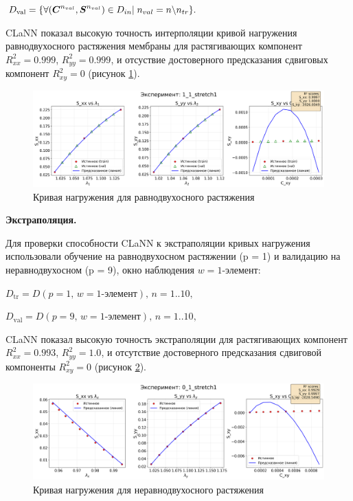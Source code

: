   $D_{\mathrm{val}}=\{\forall (\boldsymbol{C}^{n_{val}}, \boldsymbol{S}^{n_{val}}) \in D_{in}|\; n_{val}=n \backslash  n_{tr}\}.$

  CLaNN показал высокую точность интерполяции кривой нагружения равнодвухосного растяжения мембраны 
  для растягивающих компонент $R^2_{xx}=0.999$, $R^2_{yy}=0.999$, и отсуствие достоверного предсказания сдвиговых 
  компонент $R^2_{xy}=0$ (рисунок \ref{fig:interpolation}).
  
  \begin{figure}[H]
    \centering
    \includegraphics[width=1.0\textwidth]{img/interpolation.png}
    \caption{Кривая нагружения для равнодвухосного растяжения}
    \label{fig:interpolation}
  \end{figure}
  
  \textbf{Экстраполяция.}
  
  Для проверки способности CLaNN к экстраполяции кривых нагружения использовали обучение на равнодвухосном растяжении (p = 1) и валидацию на неравнодвухосном (p = 9), 
  окно наблюдения $w=\text{1-элемент}$:
  
  $D_{\mathrm{tr}} = D(p{=}1,\,w{=}\text{1-элемент}),\, n = 1..10,$
  
  $D_{\mathrm{val}} = D(p{=}9,\,w{=}\text{1-элемент}),\, n = 1..10,$
  
  CLaNN показал высокую точность экстраполяции для растягивающих компонент $R^2_{xx}=0.993$, $R^2_{yy}=1.0$, и отсутствие достоверного предсказания сдвиговой компоненты $R^2_{xy}=0$ (рисунок \ref{fig:extrapolation}).


  \begin{figure}[H]
    \centering
    \includegraphics[width=1.0\textwidth]{img/extrapolation.png}
    \caption{Кривая нагружения для неравнодвухосного растяжения}
    \label{fig:extrapolation}
  \end{figure}
   
